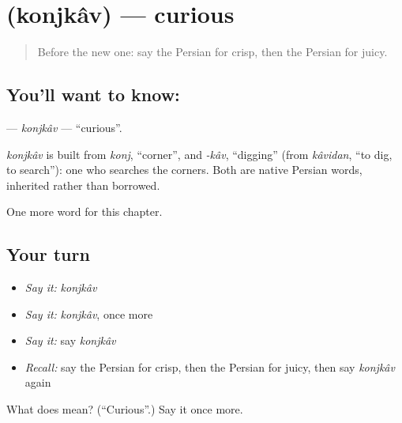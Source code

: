 \section[\texorpdfstring{\fa{کنجکاو} (konjkâv)}{کنجکاو (konjkâv)}]{ (konjkâv) — curious}

\label{lesson:FA-C238-konjkav}



\begin{quote}
Before the new one: say the Persian for crisp, then the Persian for juicy.
\end{quote}

\subsection*{You'll want to know: }
\textbf{} — \emph{konjkâv} — \textquotedblleft{}curious\textquotedblright{}.

\begin{cousinweb}
\emph{konjkâv} is built from \emph{konj}, \textquotedblleft{}corner\textquotedblright{}, and \emph{-kâv}, \textquotedblleft{}digging\textquotedblright{} (from \emph{kâvidan}, \textquotedblleft{}to dig, to search\textquotedblright{}): one who searches the corners. Both are native Persian words, inherited rather than borrowed.
\end{cousinweb}

\begin{grammarlens}[title={What you've built}]
One more word for this chapter.
\end{grammarlens}

\subsection*{Your turn}
\begin{itemize}
\raggedright
  \item \emph{Say it:} \emph{konjkâv}
  \item \emph{Say it:} \emph{konjkâv}, once more
  \item \emph{Say it:} say \emph{konjkâv}
  \item \emph{Recall:} say the Persian for crisp, then the Persian for juicy, then say \emph{konjkâv} again
\end{itemize}

\begin{tcolorbox}[breakable,colback=teal!4,colframe=teal!35!black,title={Before you move on}]
What does  mean? (\textquotedblleft{}Curious\textquotedblright{}.) Say it once more.
\end{tcolorbox}
